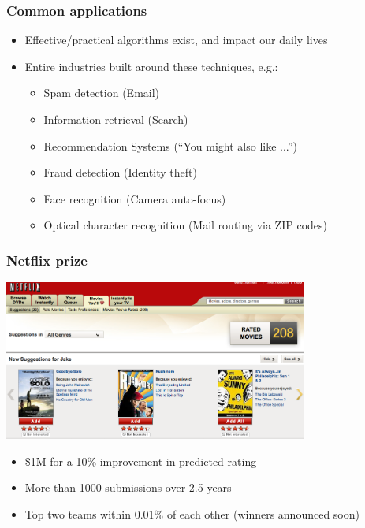 \begin{frame}
  \frametitle{Common applications}

  \begin{itemize}
    \item Effective/practical algorithms exist, and impact our daily lives
    \item Entire industries built around these techniques, e.g.:
      \begin{itemize}
        \item Spam detection (Email)
        \item Information retrieval (Search)
        \item Recommendation Systems (``You might also like ...'')
        \item Fraud detection (Identity theft)
        \item Face recognition (Camera auto-focus)
        \item Optical character recognition (Mail routing via ZIP codes)
      \end{itemize}
  \end{itemize}

\end{frame}


\begin{frame}
  \frametitle{Netflix prize}

    \begin{center}
      \includegraphics[width=0.75\textwidth]{netflix.png}
    \end{center}

    \begin{itemize}
      \item \$1M for a 10\% improvement in predicted rating
      \item More than 1000 submissions over 2.5 years
      \item Top two teams within 0.01\% of each other (winners announced soon)
    \end{itemize}

\end{frame}


